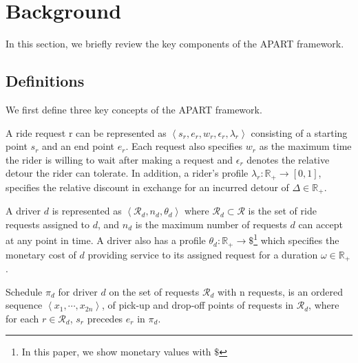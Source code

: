 \section{Background}
\label{sec:background}

In this section, we briefly review the key components of the APART framework\cite{Asghari16}. 

\subsection{Definitions}
We first define three key concepts of the APART framework.

\begin{definition} 
\label{def:req}
A ride request r can be represented as $\left\langle s_r, e_r, w_r, \epsilon_r, \lambda_r \right\rangle$ consisting of a starting point $s_r$ and an end point $e_r$. Each request also specifies $w_r$ as the maximum time the rider is willing to wait after making a request and $\epsilon_r$ denotes the relative detour the rider can tolerate. In addition, a rider's profile $\lambda_r: \mathbb{R}_{+} \rightarrow \left[ 0, 1 \right]$, specifies the relative discount in exchange for an incurred detour of $\Delta \in \mathbb{R}_{+}$.
\end{definition}

\begin{definition} [Driver]
A driver $d$ is represented as $\left\langle \mathcal{R}_d, n_d, \theta_d \right\rangle$ where $\mathcal{R}_d \subset \mathcal{R}$ is the set of ride requests assigned to $d$, and $n_d$ is the maximum number of requests $d$ can accept at any point in time. A driver also has a profile $\theta_d: \mathbb{R}_{+}  \rightarrow \$ $\footnote{In this paper, we show monetary values with $\$ $} which specifies the monetary cost of $d$ providing service to its assigned request for a duration $\omega \in \mathbb{R}_{+}$.
\end{definition}

\begin{definition} [Schedule]
Schedule $\pi_d$ for driver $d$ on the set of requests $\mathcal{R}_d$ with n requests, is an ordered sequence $\left\langle x_1, \cdots, x_{2n} \right\rangle$, of pick-up and drop-off points of requests in $\mathcal{R}_d$, where for each $r \in \mathcal{R}_d$, $s_r$ precedes $e_r$ in $\pi_d$.
\end{definition}

